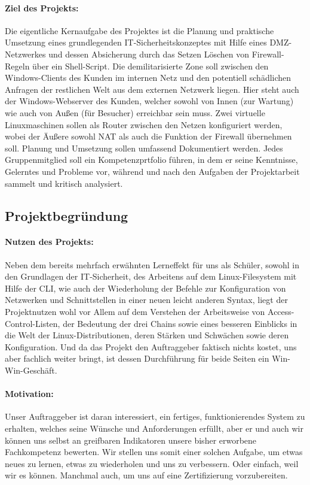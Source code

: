 \paragraph*{Ziel des Projekts: } Die eigentliche Kernaufgabe des Projektes ist die Planung und praktische Umsetzung eines grundlegenden \ac{IT}-Sicherheitskonzeptes mit Hilfe eines \ac{DMZ}-Netzwerkes und dessen Absicherung durch das Setzen \bzw Löschen von Firewall-Regeln über ein Shell-Script. Die demilitarisierte Zone soll zwischen den Windows-Clients des Kunden im internen Netz und den potentiell schädlichen Anfragen der restlichen Welt aus dem externen Netzwerk liegen. Hier steht auch der Windows-Webserver des Kunden, welcher sowohl von Innen (zur Wartung) wie auch von Außen (für Besucher) erreichbar sein muss. Zwei virtuelle Linuxmaschinen sollen als Router zwischen den Netzen konfiguriert werden, wobei der Äußere sowohl \ac{NAT} als auch die Funktion der Firewall übernehmen soll. Planung und Umsetzung sollen umfassend Dokumentiert werden. Jedes Gruppenmitglied soll ein Kompetenzprtfolio führen, in dem er seine Kenntnisse, Gelerntes und Probleme vor, während und nach den Aufgaben der Projektarbeit sammelt und kritisch analysiert.

\subsection{Projektbegründung} 
\label{sec:Projektbegruendung}
\paragraph*{Nutzen des Projekts: } Neben dem bereits mehrfach erwähnten Lerneffekt für uns als Schüler, sowohl in den Grundlagen der \ac{IT}-Sicherheit, des Arbeitens auf dem Linux-Filesystem mit Hilfe der \ac{CLI}, wie auch der Wiederholung der Befehle zur Konfiguration von Netzwerken und Schnittstellen in einer neuen leicht anderen Syntax, liegt der Projektnutzen wohl vor Allem auf dem Verstehen der Arbeitsweise von Access-Control-Listen, der Bedeutung der drei Chains sowie eines besseren Einblicks in die Welt der Linux-Distributionen, deren Stärken und Schwächen sowie deren Konfiguration. Und da das Projekt den Auftraggeber faktisch nichts kostet, uns aber fachlich weiter bringt, ist dessen Durchführung für beide Seiten ein Win-Win-Geschäft.
\paragraph*{Motivation: } Unser Auftraggeber ist daran interessiert, ein fertiges, funktionierendes System zu erhalten, welches seine Wünsche und Anforderungen erfüllt, aber er und auch wir können uns selbst an greifbaren Indikatoren unsere bisher erworbene Fachkompetenz bewerten. Wir stellen uns somit einer solchen Aufgabe, um etwas neues zu lernen, etwas zu wiederholen und uns zu verbessern. Oder einfach, weil wir es können. Manchmal auch, um uns auf eine Zertifizierung vorzubereiten.

